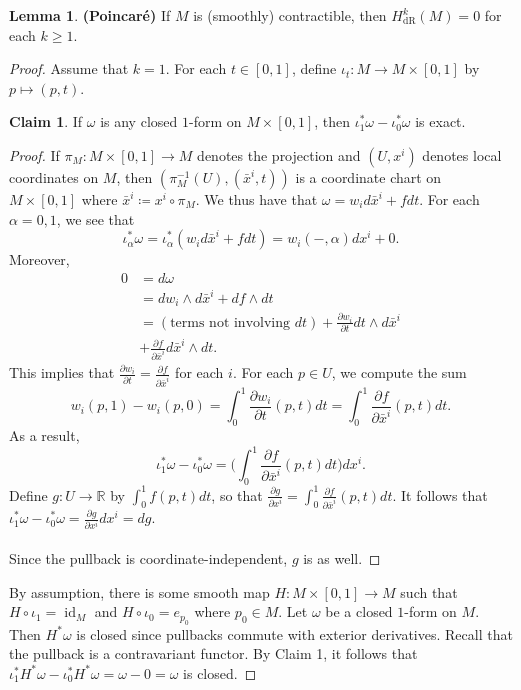 \documentclass[10pt,letterpaper,cm]{nupset}
\theoremstyle{definition}
\newtheorem{claim}{Claim}
\newtheorem{lemma}{Lemma}
\newcommand{\R}{\mathbb R}
\newcommand{\1}{\mathbf{1}}
\newcommand{\0}{\vec 0}
\DeclareMathOperator{\id}{id}
\DeclareMathOperator{\dr}{dR}
\begin{document}
\begin{lemma}{\textbf{(Poincar\'e)}}
If $M$ is (smoothly) contractible, then $H_{\dr}^k(M) = 0$ for each $k\geq 1$.
\end{lemma}
\begin{proof}
Assume that $k=1$. For each $t\in [0,1]$, define $\iota_t : M \to M \times [0,1]$ by $p\mapsto (p, t)$.
\begin{claim} If $\omega$ is any closed $1$-form  on $M\times [0,1]$, then $\iota^{\ast}_1\omega -\iota^{\ast}_0\omega$ is exact. \end{claim}
\begin{proof} If $\pi_M : M \times [0,1] \to M$ denotes the projection and $(U, x^i)$ denotes local coordinates on $M$, then $(\pi_M^{-1}(U), (\bar{x}^i, t))$ is a coordinate chart on $M \times [0,1]$ where $\bar{x}^i \coloneqq  x^i \circ \pi_M$. We thus have that $\omega = w_id\bar{x}^i+ f dt$. For each $\alpha =0,1$, we see that $$ \iota^{\ast}_{\alpha}\omega = \iota^{\ast}_{\alpha}(w_id\bar{x}^i +fdt)=w_i(-, \alpha)dx^i +0  .$$ Moreover, 
\begin{align*}  0 & =d\omega
\\ &  =dw_i \wedge d\bar{x}^i +df \wedge dt \\ & = (\text{terms not involving }dt) +\frac{\partial{w_i}}{\partial{t}}dt \wedge d\bar{x}^i 
\\ & +\frac{\partial{f}}{\partial{\bar{x}^i}}d\bar{x}^i\wedge dt  . \end{align*}
This implies that $\frac{\partial{w_i}}{\partial{t}} = \frac{\partial{f}}{\partial{\bar{x}^i}}$ for each $i$. For each $p\in U$, we compute the sum 
$$ w_i(p, 1) -w_i(p,0) = \int_0^1  \frac{\partial{w_i}}{\partial{t}}(p, t)dt =  \int_0^1 \frac{\partial{f}}{\partial{\bar{x}^i}}(p,t)dt .$$ As a result, $$\iota^{\ast}_1 \omega -\iota^{\ast}_0 \omega =  \big( \int_0^1 \frac{\partial{f}}{\partial{\bar{x}^i}}(p,t)dt \big )dx^i .$$ Define $g: U \to \R$ by $\int_0^1f(p,t)dt$, so that $\frac{\partial{g}}{\partial{x^i}} = \int_0^1\frac{\partial{f}}{\partial{\bar{x}^i}}(p,t)dt$. It follows that $\iota^{\ast}_1 \omega -\iota^{\ast}_0 \omega  = \frac{\partial{g}}{\partial{x^i}}dx^i = dg.$
\\ \\ Since the pullback is coordinate-independent, $g$ is as well.
\end{proof}
By assumption, there is some smooth map $H: M \times [0,1] \to M$ such that $H \circ \iota_1 =\id_M$ and $H \circ \iota_0 = e_{p_0}$ where $p_0 \in M$. Let $\omega$ be a closed $1$-form  on $M$. Then $H^{\ast} \omega$ is closed since pullbacks commute with exterior derivatives. Recall that the pullback is a contravariant functor. By Claim 1, it follows that $\iota^{\ast}_1H^{\ast}\omega - \iota^{\ast}_0 H^{\ast}\omega = \omega -0 = \omega$ is closed.

\end{proof}
\end{document}
